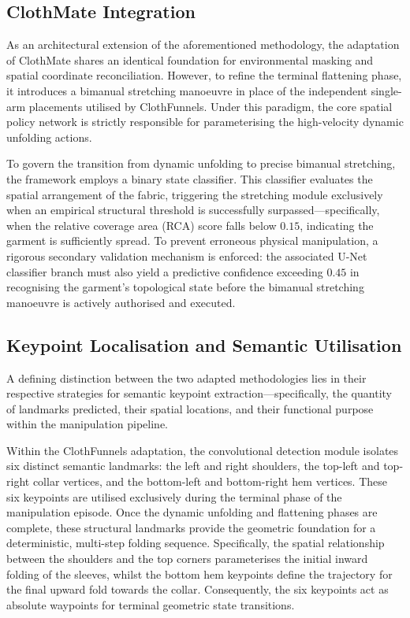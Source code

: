 \documentclass[journal]{IEEEtran}
\begin{document}
\subsection{ClothMate Integration}
As an architectural extension of the aforementioned methodology, the adaptation of ClothMate shares an identical foundation for environmental masking and spatial coordinate reconciliation. However, to refine the terminal flattening phase, it introduces a bimanual stretching manoeuvre in place of the independent single-arm placements utilised by ClothFunnels. Under this paradigm, the core spatial policy network is strictly responsible for parameterising the high-velocity dynamic unfolding actions. 

To govern the transition from dynamic unfolding to precise bimanual stretching, the framework employs a binary state classifier. This classifier evaluates the spatial arrangement of the fabric, triggering the stretching module exclusively when an empirical structural threshold is successfully surpassed—specifically, when the relative coverage area (RCA) score falls below $0.15$, indicating the garment is sufficiently spread. To prevent erroneous physical manipulation, a rigorous secondary validation mechanism is enforced: the associated U-Net classifier branch must also yield a predictive confidence exceeding $0.45$ in recognising the garment's topological state before the bimanual stretching manoeuvre is actively authorised and executed.

\subsection{Keypoint Localisation and Semantic Utilisation}
A defining distinction between the two adapted methodologies lies in their respective strategies for semantic keypoint extraction—specifically, the quantity of landmarks predicted, their spatial locations, and their functional purpose within the manipulation pipeline. 

Within the ClothFunnels adaptation, the convolutional detection module isolates six distinct semantic landmarks: the left and right shoulders, the top-left and top-right collar vertices, and the bottom-left and bottom-right hem vertices. These six keypoints are utilised exclusively during the terminal phase of the manipulation episode. Once the dynamic unfolding and flattening phases are complete, these structural landmarks provide the geometric foundation for a deterministic, multi-step folding sequence. Specifically, the spatial relationship between the shoulders and the top corners parameterises the initial inward folding of the sleeves, whilst the bottom hem keypoints define the trajectory for the final upward fold towards the collar. Consequently, the six keypoints act as absolute waypoints for terminal geometric state transitions.
\end{document}
